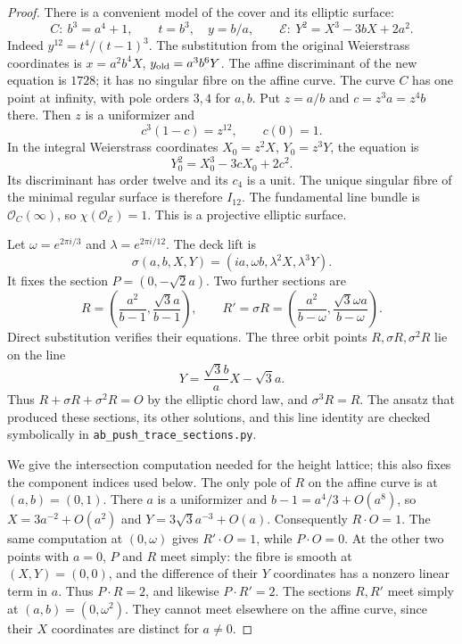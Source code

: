 \begin{proof}
There is a convenient model of the cover
and its elliptic surface:
\[
 C:\ b^3=a^4+1,\qquad
 t=b^3,\quad y=b/a,\qquad
 \mathscr E:\ Y^2=X^3-3bX+2a^2.
\]
Indeed $y^{12}=t^4/(t-1)^3$.
The substitution from the original
Weierstrass coordinates is
$x=a^2b^4X$, $y_{\rm old}=a^3b^6Y$.
The affine discriminant of the new
equation is $1728$; it has no singular
fibre on the affine curve. The curve
$C$ has one point at infinity, with
pole orders $3,4$ for $a,b$.
Put $z=a/b$ and $c=z^3a=z^4b$ there.
Then $z$ is a uniformizer and
\[
 c^3(1-c)=z^{12},\qquad c(0)=1.
\]
In the integral Weierstrass coordinates
$X_0=z^2X$, $Y_0=z^3Y$, the equation is
\[
 Y_0^2=X_0^3-3cX_0+2c^2.
\]
Its discriminant has order twelve and
its $c_4$ is a unit. The unique singular
fibre of the minimal regular surface
is therefore $I_{12}$. The fundamental
line bundle is $\mathcal O_C(\infty)$,
so $\chi(\mathcal O_{\mathscr E})=1$.
This is a projective elliptic surface.

Let $\omega=e^{2\pi i/3}$ and
$\lambda=e^{2\pi i/12}$. The deck lift is
\[
 \sigma(a,b,X,Y)=(ia,\omega b,\lambda^2X,\lambda^3Y).
\]
It fixes the section $P=(0,-\sqrt2a)$.
Two further sections are
\[
 R=\left(\frac{a^2}{b-1},
                 \frac{\sqrt3a}{b-1}\right),
 \qquad
 R'=\sigma R=
   \left(\frac{a^2}{b-\omega},
                 \frac{\sqrt3\omega a}{b-\omega}\right).
\]
Direct substitution verifies their
equations. The three orbit points
$R,\sigma R,\sigma^2R$ lie on the line
\[
 Y=\frac{\sqrt3b}{a}X-\sqrt3a.
\]
Thus $R+\sigma R+\sigma^2R=O$ by the
elliptic chord law, and $\sigma^3R=R$.
The ansatz that produced these sections,
its other solutions, and this line
identity are checked symbolically in
\texttt{ab\_push\_trace\_sections.py}.

We give the intersection computation
needed for the height lattice; this
also fixes the component indices used
below. The only pole of $R$ on the affine
curve is at $(a,b)=(0,1)$. There $a$ is
a uniformizer and $b-1=a^4/3+O(a^8)$,
so $X=3a^{-2}+O(a^2)$ and
$Y=3\sqrt3a^{-3}+O(a)$.
Consequently $R\cdot O=1$.
The same computation at $(0,\omega)$
gives $R'\cdot O=1$, while $P\cdot O=0$.
At the other two points with $a=0$,
$P$ and $R$ meet simply: the fibre is
smooth at $(X,Y)=(0,0)$, and the
difference of their $Y$ coordinates
has a nonzero linear term in $a$.
Thus $P\cdot R=2$, and likewise
$P\cdot R'=2$. The sections $R,R'$
meet simply at $(a,b)=(0,\omega^2)$.
They cannot meet elsewhere on the
affine curve, since their $X$
coordinates are distinct for $a\ne0$.


\end{proof}
